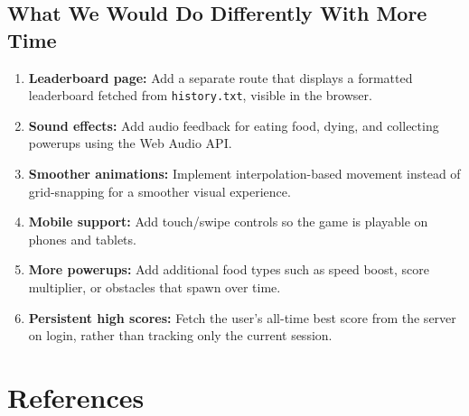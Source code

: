 \documentclass[12pt,a4paper]{article}
\begin{document}
\subsection{What We Would Do Differently With More Time}

\begin{enumerate}
    \item \textbf{Leaderboard page:} Add a separate route that displays a formatted leaderboard fetched from \texttt{history.txt}, visible in the browser.
    \item \textbf{Sound effects:} Add audio feedback for eating food, dying, and collecting powerups using the Web Audio API.
    \item \textbf{Smoother animations:} Implement interpolation-based movement instead of grid-snapping for a smoother visual experience.
    \item \textbf{Mobile support:} Add touch/swipe controls so the game is playable on phones and tablets.
    \item \textbf{More powerups:} Add additional food types such as speed boost, score multiplier, or obstacles that spawn over time.
    \item \textbf{Persistent high scores:} Fetch the user's all-time best score from the server on login, rather than tracking only the current session.
\end{enumerate}

\section{References}
\end{document}
